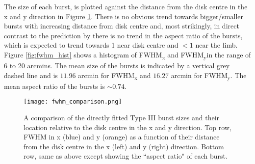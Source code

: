 

The size of each burst, is plotted against the distance from the disk centre in the x and y direction in Figure \ref{fig:fwhm_comp}. There is no obvious trend towards bigger/smaller bursts with increasing distance from disk centre and, most strikingly, in direct contrast to the prediction by \cite{Kontar2019} there is no trend in the aspect ratio of the bursts, which is expected to trend towards 1 near disk centre and $< 1$ near the limb. Figure \ref{fig:fwhm_hist} shows a histogram of FWHM\textsubscript{x} and FWHM\textsubscript{y}in the range of 6 to 20 arcmins. The mean size of the bursts is indicated by a vertical grey dashed line and is $11.96$ arcmin for FWHM\textsubscript{x} and $16.27$ arcmin for FWHM\textsubscript{y}. The mean aspect ratio of the bursts is $\sim 0.74$.

\begin{figure}[ht]
\centering
\texttt{[image: fwhm\_comparison.png]}
\caption[Directly fitted Type III burst sizes as a function of position relative to disk centre.]{A comparison of the directly fitted Type III burst sizes and their location relative to the disk centre in the x and y direction. Top row, FWHM in x (blue) and y (orange) as a function of their distance from the disk centre in the x (left) and y (right) direction. Bottom row, same as above except showing the ``aspect ratio" of each burst.}
\label{fig:fwhm_comp}
\end{figure}

